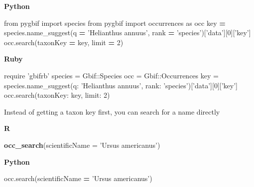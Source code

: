 \documentclass[author-year, review, 11pt]{components/elsarticle} %
\newenvironment{Shaded}{\begin{snugshade}}{\end{snugshade}}
\newcommand{\KeywordTok}[1]{\textcolor[rgb]{0.13,0.29,0.53}{\textbf{#1}}}
\newcommand{\DataTypeTok}[1]{\textcolor[rgb]{0.13,0.29,0.53}{#1}}
\newcommand{\DecValTok}[1]{\textcolor[rgb]{0.00,0.00,0.81}{#1}}
\newcommand{\StringTok}[1]{\textcolor[rgb]{0.31,0.60,0.02}{#1}}
\newcommand{\ImportTok}[1]{#1}
\newcommand{\OperatorTok}[1]{\textcolor[rgb]{0.81,0.36,0.00}{\textbf{#1}}}
\newcommand{\NormalTok}[1]{#1}
\begin{document}
\textbf{Python}

\begin{Shaded}
\begin{Highlighting}[]
\ImportTok{from}\NormalTok{ pygbif }\ImportTok{import}\NormalTok{ species}
\ImportTok{from}\NormalTok{ pygbif }\ImportTok{import}\NormalTok{ occurrences }\ImportTok{as}\NormalTok{ occ}
\NormalTok{key }\OperatorTok{=}\NormalTok{ species.name_suggest(q }\OperatorTok{=} \StringTok{'Helianthus annuus'}\NormalTok{, rank }\OperatorTok{=} \StringTok{'species'}\NormalTok{)[}\StringTok{'data'}\NormalTok{][}\DecValTok{0}\NormalTok{][}\StringTok{'key'}\NormalTok{]}
\NormalTok{occ.search(taxonKey }\OperatorTok{=}\NormalTok{ key, limit }\OperatorTok{=} \DecValTok{2}\NormalTok{)}
\end{Highlighting}
\end{Shaded}

\textbf{Ruby}

\begin{Shaded}
\begin{Highlighting}[]
\NormalTok{require }\StringTok{'gbifrb'}
\NormalTok{species = }\DataTypeTok{Gbif}\NormalTok{::}\DataTypeTok{Species}
\NormalTok{occ = }\DataTypeTok{Gbif}\NormalTok{::}\DataTypeTok{Occurrences}
\NormalTok{key = species.name_suggest(}\StringTok{q: 'Helianthus annuus'}\NormalTok{, }\StringTok{rank: 'species'}\NormalTok{)[}\StringTok{'data'}\NormalTok{][}\DecValTok{0}\NormalTok{][}\StringTok{'key'}\NormalTok{]}
\NormalTok{occ.search(}\StringTok{taxonKey: }\NormalTok{key, }\StringTok{limit: }\DecValTok{2}\NormalTok{)}
\end{Highlighting}
\end{Shaded}

Instead of getting a taxon key first, you can search for a name directly

\textbf{R}

\begin{Shaded}
\begin{Highlighting}[]
\KeywordTok{occ_search}\NormalTok{(}\DataTypeTok{scientificName =} \StringTok{'Ursus americanus'}\NormalTok{)}
\end{Highlighting}
\end{Shaded}

\textbf{Python}

\begin{Shaded}
\begin{Highlighting}[]
\NormalTok{occ.search(scientificName }\OperatorTok{=} \StringTok{'Ursus americanus'}\NormalTok{)}
\end{Highlighting}
\end{Shaded}
\end{document}
